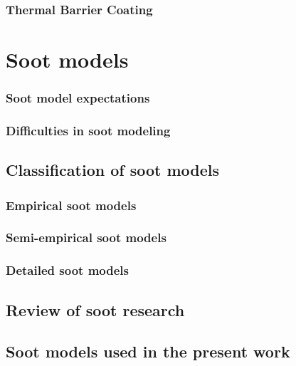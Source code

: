 \subsubsection{Thermal Barrier Coating}

\section{Soot models}

\subsubsection{Soot model expectations}

\subsubsection{Difficulties in soot modeling}





\subsection{Classification of soot models}

\subsubsection{Empirical soot models}


\subsubsection{Semi-empirical soot models}



\subsubsection{Detailed soot models}



\subsection{Review of soot research}



\subsection{Soot models used in the present work} \label{2Eq_sootModel}

